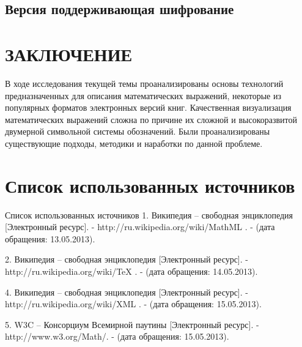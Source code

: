 \section{Версия поддерживающая шифрование}

\newpage
\chapter*{ЗАКЛЮЧЕНИЕ}

В ходе исследования текущей темы проанализированы основы технологий предназначенных для описания математических выражений, некоторые из популярных форматов электронных версий книг.
Качественная визуализация математических выражений сложна по причине их сложной и высокоразвитой двумерной символьной системы обозначений.
Были проанализированы существующие подходы, методики и наработки по данной проблеме.

\newpage
\chapter*{Список использованных источников}


Список использованных источников
1. Википедия – свободная энциклопедия [Электронный ресурс]. -  http://ru.wikipedia.org/wiki/MathML . - (дата обращения: 13.05.2013).

2. Википедия – свободная энциклопедия [Электронный ресурс]. -  http://ru.wikipedia.org/wiki/TeX . - (дата обращения: 14.05.2013).


4. Википедия – свободная энциклопедия [Электронный ресурс]. -  http://ru.wikipedia.org/wiki/XML . - (дата обращения: 15.05.2013).

5. W3C – Консорциум Всемирной паутины [Электронный ресурс]. -  http://www.w3.org/Math/. - (дата обращения: 15.05.2013).
